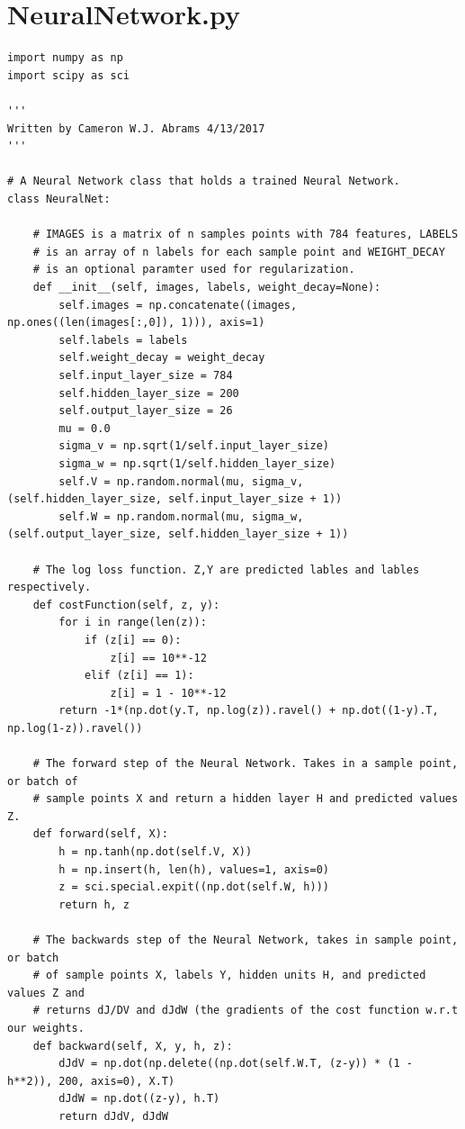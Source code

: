 \documentclass[12pt]{article}
\newenvironment{problem}[2][Problem]{\begin{trivlist}
\item[\hskip \labelsep {\bfseries #1}\hskip \labelsep {\bfseries #2.}]}{\end{trivlist}}
\begin{document}
\newpage
\begin{problem}{4: Bells and Whistles}
\end{problem}
\newpage
\appendix
\section{\\NeuralNetwork.py}
\begin{verbatim}
import numpy as np
import scipy as sci

'''
Written by Cameron W.J. Abrams 4/13/2017
'''

# A Neural Network class that holds a trained Neural Network.
class NeuralNet:

	# IMAGES is a matrix of n samples points with 784 features, LABELS
	# is an array of n labels for each sample point and WEIGHT_DECAY
	# is an optional paramter used for regularization. 
	def __init__(self, images, labels, weight_decay=None):
		self.images = np.concatenate((images, np.ones((len(images[:,0]), 1))), axis=1)
		self.labels = labels
		self.weight_decay = weight_decay
		self.input_layer_size = 784
		self.hidden_layer_size = 200
		self.output_layer_size = 26
		mu = 0.0
		sigma_v = np.sqrt(1/self.input_layer_size)
		sigma_w = np.sqrt(1/self.hidden_layer_size)
		self.V = np.random.normal(mu, sigma_v, (self.hidden_layer_size, self.input_layer_size + 1))
		self.W = np.random.normal(mu, sigma_w, (self.output_layer_size, self.hidden_layer_size + 1))

	# The log loss function. Z,Y are predicted lables and lables respectively.
	def costFunction(self, z, y):
		for i in range(len(z)):
			if (z[i] == 0):
				z[i] == 10**-12
			elif (z[i] == 1):
				z[i] = 1 - 10**-12
		return -1*(np.dot(y.T, np.log(z)).ravel() + np.dot((1-y).T, np.log(1-z)).ravel())

	# The forward step of the Neural Network. Takes in a sample point, or batch of
	# sample points X and return a hidden layer H and predicted values Z.
	def forward(self, X):
		h = np.tanh(np.dot(self.V, X))
		h = np.insert(h, len(h), values=1, axis=0)
		z = sci.special.expit((np.dot(self.W, h)))
		return h, z

	# The backwards step of the Neural Network, takes in sample point, or batch
	# of sample points X, labels Y, hidden units H, and predicted values Z and
	# returns dJ/DV and dJdW (the gradients of the cost function w.r.t our weights.
	def backward(self, X, y, h, z):
		dJdV = np.dot(np.delete((np.dot(self.W.T, (z-y)) * (1 - h**2)), 200, axis=0), X.T)
		dJdW = np.dot((z-y), h.T)
		return dJdV, dJdW


\end{verbatim}
\end{document}
